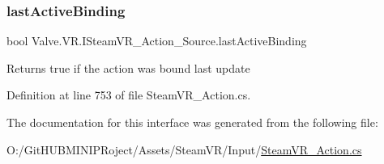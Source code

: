 \subsubsection{\texorpdfstring{lastActiveBinding}{lastActiveBinding}}
{\footnotesize\ttfamily bool Valve.\+V\+R.\+I\+Steam\+V\+R\+\_\+\+Action\+\_\+\+Source.\+last\+Active\+Binding\hspace{0.3cm}{\ttfamily [get]}}



Returns true if the action was bound last update 



Definition at line 753 of file Steam\+V\+R\+\_\+\+Action.\+cs.



The documentation for this interface was generated from the following file\+:\begin{DoxyCompactItemize}
\item 
O\+:/\+Git\+H\+U\+B\+M\+I\+N\+I\+P\+Roject/\+Assets/\+Steam\+V\+R/\+Input/\mbox{\hyperlink{_steam_v_r___action_8cs}{Steam\+V\+R\+\_\+\+Action.\+cs}}\end{DoxyCompactItemize}

